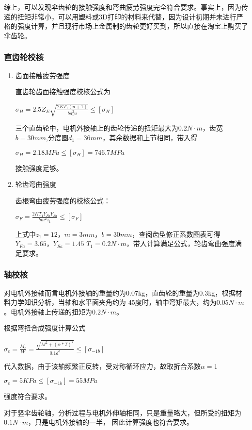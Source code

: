 综上，可以发现伞齿轮的接触强度和弯曲疲劳强度完全符合要求。事实上，因为传递的扭矩非常小，可以用塑料或3D打印的材料来代替，因为设计初期并未进行严格的强度计算，并且现行市场上金属制的齿轮更好买到，所以直接在淘宝上购买了伞齿轮。

\subsubsection{直齿轮校核}
\begin{enumerate}
  \item 齿面接触疲劳强度

  直齿轮齿面接触强度校核公式为

  \begin{center}
    $\sigma_{H}=2.5Z_{E}\sqrt{\frac{2KT_{1}(u+1)}{bd_{1}^{2}u}}\le[\sigma_{H}]$
  \end{center}

  三个直齿轮中，电机外接轴上的齿轮传递的扭矩最大为$0.2N \cdot m$，齿宽$b=30mm$,分度圆$d_{1}=36mm$，其余数据和上节相同，带入得

  \begin{center}
    $\sigma_{H}=2.18MPa\le[\sigma_{H}]=746.7MPa$
  \end{center}
  接触强度足够。

\item 轮齿弯曲强度

齿根弯曲疲劳强度的校核公式：

\begin{center}
  $\sigma_{F}=\frac{2KT_{1}Y_{Fa}Y_{Sa}}{bm^{2}z_{1}}\le[\sigma_{F}]$
\end{center}

  上式中$z_{1}=12$，$m=3mm$，$b=30mm$，查阅齿型修正系数图表可得$Y_{Fa}=3.65$，$Y_{Sa}=1.45$ $T_{1}=0.2N \cdot m$，带入计算满足公式，轮齿弯曲强度满足要求。

\end{enumerate}

\subsubsection{轴校核}

对电机外接轴而言电机外接轴的重量约为0.07kg，直齿轮的重量为0.3kg，根据材料力学知识分析，当轴和水平面夹角约为
45度时，轴中弯矩最大，约为$0.05N \cdot m$。电机外接轴上传递的扭矩为$0.2N \cdot m$。


根据弯扭合成强度计算公式

\begin{center}
  $\sigma_{e}=\frac{M_{e}}{W}=\frac{\sqrt{M^{2}+(\alpha*T)^{2}}}{0.1d^{3}}\leq[\sigma_{-1b}]$
\end{center}

代入数据，由于该轴频繁正反转，受对称循环应力，故取折合系数$\alpha=1$

\begin{center}
  $\sigma_{e}=5KPa\leq[\sigma_{-1b}]=55MPa$
\end{center}

强度符合要求。

对于竖伞齿轮轴，分析过程与电机外伸轴相同，只是重量略大，但所受的扭矩为$0.1N \cdot m$，只是电机外接轴的一半，
因此计算强度也符合要求。
